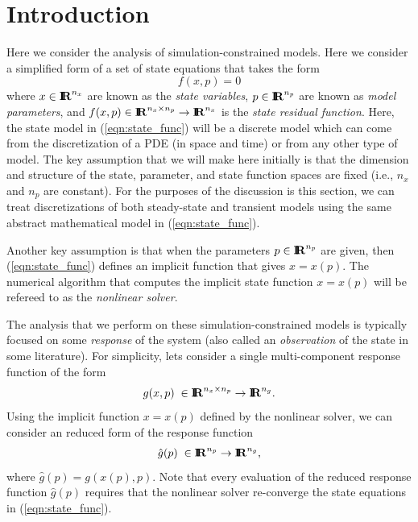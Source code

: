 \documentclass[pdf,ps2pdf,11pt]{SANDreport}
\begin{document}
%


\SANDmain %


%
\section{Introduction}
%

Here we consider the analysis of simulation-constrained models.  Here we
consider a simplified form of a set of state equations that takes the form
%
\begin{equation}
f( x, p ) = 0
\label{eqn:state_func}
\end{equation}
%
where $x{}\in\mbox{\textbf{I}}\hspace{-0.6ex}\mbox{\textbf{R}}^{n_x}$ are known as the {}\textit{state variables},
$p\in\mbox{\textbf{I}}\hspace{-0.6ex}\mbox{\textbf{R}}^{n_p}$ are known as {}\textit{model parameters}, and
$f(x,p)\in\mbox{\textbf{I}}\hspace{-0.6ex}\mbox{\textbf{R}}^{n_x\times{}n_p}\rightarrow\mbox{\textbf{I}}\hspace{-0.6ex}\mbox{\textbf{R}}^{n_x}$ is the {}\textit{state
residual function}.  Here, the state model in (\ref{eqn:state_func}) will be a
discrete model which can come from the discretization of a PDE (in space and
time) or from any other type of model.  The key assumption that we will make
here initially is that the dimension and structure of the state, parameter,
and state function spaces are fixed (i.e., $n_x$ and $n_p$ are constant).  For
the purposes of the discussion is this section, we can treat discretizations
of both steady-state and transient models using the same abstract mathematical
model in (\ref{eqn:state_func}).

Another key assumption is that when the parameters $p\in\mbox{\textbf{I}}\hspace{-0.6ex}\mbox{\textbf{R}}^{n_p}$ are given,
then (\ref{eqn:state_func}) defines an implicit function that gives $x=x(p)$.
The numerical algorithm that computes the implicit state function $x=x(p)$
will be refereed to as the {}\textit{nonlinear solver}.

The analysis that we perform on these simulation-constrained models is
typically focused on some {}\textit{response} of the system (also called an
{}\textit{observation} of the state in some literature).  For simplicity, lets
consider a single multi-component response function of the form
%
\begin{equation}
g( x, p ) \; \in \mbox{\textbf{I}}\hspace{-0.6ex}\mbox{\textbf{R}}^{n_x \times n_p} \rightarrow \mbox{\textbf{I}}\hspace{-0.6ex}\mbox{\textbf{R}}^{n_g}.
\label{eqn:response_func}
\end{equation}
%
Using the implicit function $x=x(p)$ defined by the nonlinear solver, we can
consider an reduced form of the response function
%
\begin{equation}
\hat{g}(p) \; \in \mbox{\textbf{I}}\hspace{-0.6ex}\mbox{\textbf{R}}^{n_p} \rightarrow \mbox{\textbf{I}}\hspace{-0.6ex}\mbox{\textbf{R}}^{n_g},
\label{eqn:red_response_func}
\end{equation}
%
where $\hat{g}(p) = g(x(p),p)$.  Note that every evaluation of the reduced
response function $\hat{g}(p)$ requires that the nonlinear solver re-converge
the state equations in (\ref{eqn:state_func}).
\end{document}
